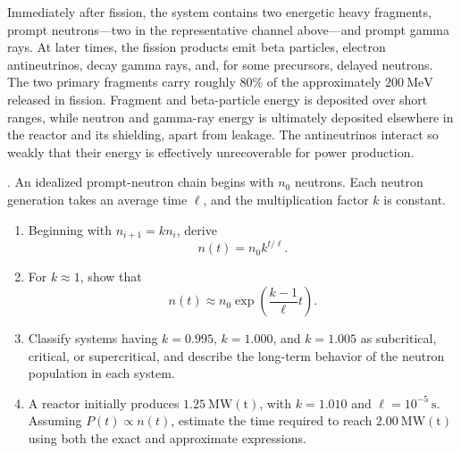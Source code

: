 \begin{adaptedsolution}
Immediately after fission, the system contains two energetic heavy fragments,
prompt neutrons---two in the representative channel above---and prompt gamma
rays.  At later times, the fission products emit beta particles, electron
antineutrinos, decay gamma rays, and, for some precursors, delayed neutrons.
The two primary fragments carry roughly $80\%$ of the approximately
$200\ \mathrm{MeV}$ released in fission.  Fragment and beta-particle energy is
deposited over short ranges, while neutron and gamma-ray energy is ultimately
deposited elsewhere in the reactor and its shielding, apart from leakage.  The
antineutrinos interact so weakly that their energy is effectively unrecoverable
for power production.
\end{adaptedsolution}

\newpage

.  An idealized
prompt-neutron chain begins with $n_0$ neutrons.  Each neutron generation takes
an average time $\ell$, and the multiplication factor $k$ is constant.

\begin{enumerate}[label=(\alph*)]
\item Beginning with $n_{i+1}=kn_i$, derive
\[
 n(t)=n_0 k^{t/\ell}.
\]
\item For $k\approx1$, show that
\[
 n(t)\approx n_0\exp\left(\frac{k-1}{\ell}t\right).
\]
\item Classify systems having $k=0.995$, $k=1.000$, and $k=1.005$ as
subcritical, critical, or supercritical, and describe the long-term behavior
of the neutron population in each system.
\item A reactor initially produces $1.25~\mathrm{MW(t)}$, with $k=1.010$ and
$\ell=10^{-5}~\mathrm{s}$.  Assuming $P(t)\propto n(t)$, estimate the time
required to reach $2.00~\mathrm{MW(t)}$ using both the exact and approximate
expressions.
\end{enumerate}

